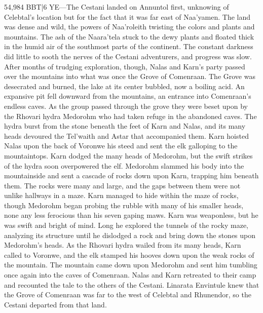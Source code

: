 \documentclass[smalldemyvopaper,11pt,twoside,onecolumn,openright,extrafontsizes]{memoir}
\begin{document}
{{54,984 BBT|6 YE—The Cestani landed on Annuntol first, unknowing of Celebtal’s location but for the fact that it was far east of Naa’yamen. The land was dense and wild, the powers of Naa’roleith twisting the colors and plants and mountains. The ash of the Naara’tela stuck to the dewy plants and floated thick in the humid air of the southmost parts of the continent. The constant darkness did little to sooth the nerves of the Cestani adventurers, and progress was slow. After months of trudging exploration, though, Nalas and Karn’s party passed over the mountains into what was once the Grove of Comenraan. The Grove was desecrated and burned, the lake at its center bubbled, now a boiling acid. An expansive pit fell downward from the mountains, an entrance into Comenraan’s endless caves. As the group passed through the grove they were beset upon by the Rhovari hydra Medorohm who had taken refuge in the abandoned caves. The hydra burst from the stone beneath the feet of Karn and Nalas, and its many heads devoured the Tel’waith and Astar that accompanied them. Karn hoisted Nalas upon the back of Voronwe his steed and sent the elk galloping to the mountaintops.
	Karn dodged the many heads of Medorohm, but the swift strikes of the hydra soon overpowered the elf. Medorohm slammed his body into the mountainside and sent a cascade of rocks down upon Karn, trapping him beneath them. The rocks were many and large, and the gaps between them were not unlike hallways in a maze. Karn managed to hide within the maze of rocks, though Medorohm began probing the rubble with many of his smaller heads, none any less ferocious than his seven gaping maws. Karn was weaponless, but he was swift and bright of mind. Long he explored the tunnels of the rocky maze, analyzing its structure until he dislodged a rock and bring down the stones upon Medorohm’s heads. As the Rhovari hydra wailed from its many heads, Karn called to Voronwe, and the elk stamped his hooves down upon the weak rocks of the mountain. The mountain came down upon Medorohm and sent him tumbling once again into the caves of Comenraan.
	Nalas and Karn retreated to their camp and recounted the tale to the others of the Cestani. Linarata Envintule knew that the Grove of Comenraan was far to the west of Celebtal and Rhunendor, so the Cestani departed from that land.

}}
\end{document}
